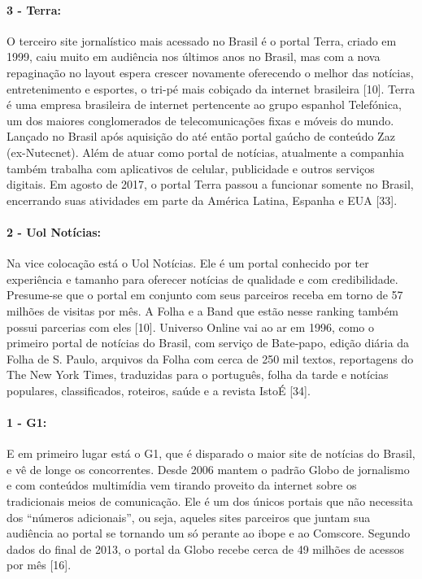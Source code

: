 \documentclass[a4paper]{article}
\begin{document}
\begin{titlepage}
\paragraph{3 - Terra: }

O terceiro site jornalístico mais acessado no Brasil é o portal Terra, criado em 1999, caiu muito em audiência nos últimos anos no Brasil, mas com a nova repaginação no layout espera crescer novamente oferecendo o melhor das notícias, entretenimento e esportes, o tri-pé mais cobiçado da internet brasileira [10]. Terra é uma empresa brasileira de internet pertencente ao grupo espanhol Telefónica, um dos maiores conglomerados de telecomunicações fixas e móveis do mundo. Lançado no Brasil após aquisição do até então portal gaúcho de conteúdo Zaz (ex-Nutecnet). Além de atuar como portal de notícias, atualmente a companhia também trabalha com aplicativos de celular, publicidade e outros serviços digitais. Em agosto de 2017, o portal Terra passou a funcionar somente no Brasil, encerrando suas atividades em parte da América Latina, Espanha e EUA [33].

\paragraph{2 - Uol Notícias: }

Na vice colocação está o Uol Notícias. Ele é um portal conhecido por ter experiência e tamanho para oferecer notícias de qualidade e com credibilidade. Presume-se que o portal em conjunto com seus parceiros receba em torno de 57 milhões de visitas por mês. A Folha e a Band que estão nesse ranking também possui parcerias com eles [10]. Universo Online vai ao ar em 1996, como o primeiro portal de notícias do Brasil, com serviço de Bate-papo, edição diária da Folha de S. Paulo, arquivos da Folha com cerca de 250 mil textos, reportagens do The New York Times, traduzidas para o português, folha da tarde e notícias populares, classificados, roteiros, saúde e a revista IstoÉ [34].

\paragraph{1 - G1: }

E em primeiro lugar está o G1, que é disparado o maior site de notícias do Brasil, e vê de longe os concorrentes. Desde 2006 mantem o padrão Globo de jornalismo e com conteúdos multimídia vem tirando proveito da internet sobre os tradicionais meios de comunicação. Ele é um dos únicos portais que não necessita dos “números adicionais”, ou seja, aqueles sites parceiros que juntam sua audiência ao portal se tornando um só perante ao ibope e ao Comscore. Segundo dados do final de 2013, o portal da Globo recebe cerca de 49 milhões de acessos por mês [16].


\end{titlepage}
\end{document}

